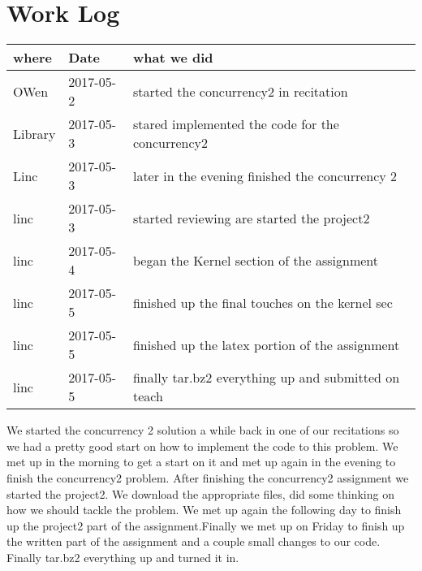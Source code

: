 \documentclass[letterpaper,10pt,titlepage]{article}
\begin{document}
\section{Work Log}

\begin{tabular}{lll} \textbf{where}
     & \textbf{Date}
     & \textbf{what we did}

\\ \hline
OWen & 2017-05-2 & started the concurrency2 in recitation  \\ \hline
Library & 2017-05-3 & stared implemented the code for the concurrency2 \\ \hline
Linc & 2017-05-3 &  later in the evening finished the concurrency 2\\ \hline
linc & 2017-05-3 & started reviewing are started the project2 \\ \hline
linc & 2017-05-4 & began the Kernel section of the assignment \\ \hline
linc & 2017-05-5 & finished up the final touches on the kernel sec \\ \hline
linc & 2017-05-5 & finished up the latex portion of the assignment \\ \hline
linc & 2017-05-5 & finally tar.bz2 everything up and submitted on teach \\ \hline




\end{tabular}

We started the concurrency 2 solution a while back in one of our recitations so we had a pretty good start on how to implement the code to this problem. We met up in the morning to get a start on it and met up again in the evening to finish the concurrency2 problem. After finishing the concurrency2 assignment we started the project2. We download the appropriate files, did some thinking on how we should tackle the problem. We met up again the following day to finish up the project2 part of the assignment.Finally we met up on Friday to finish up the written part of the assignment and a couple small changes to our code. Finally tar.bz2 everything up and turned it in.
\end{document}
